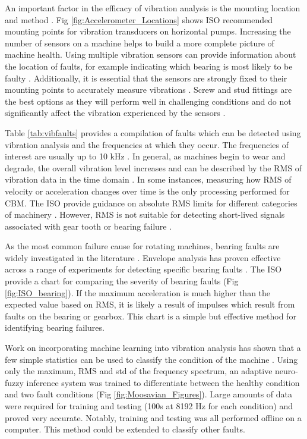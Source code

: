 An important factor in the efficacy of vibration analysis is the mounting location and method \cite{Smart_Bearings_1}.
Fig \ref{fig:Accelerometer_Locations} shows ISO recommended mounting points for vibration transducers on horizontal pumps.
Increasing the number of sensors on a machine helps to build a more complete picture of machine health.
Using multiple vibration sensors can provide information about the location of faults, for example indicating which bearing is most likely to be faulty \cite{CM_mcsa_vib}.
Additionally, it is essential that the sensors are strongly fixed to their mounting points to accurately measure vibrations \cite{Smart_Bearings_1}.
Screw and stud fittings are the best options as they will perform well in challenging conditions and do not significantly affect the vibration experienced by the sensors \cite{Smart_Bearings_1}.
\par

Table \ref{tab:vibfaults} provides a compilation of faults which can be detected using vibration analysis and the frequencies at which they occur.
The frequencies of interest are usually up to 10 kHz \cite{CM_randall}.
In general, as machines begin to wear and degrade, the overall vibration level increases and can be described by the RMS of vibration data in the time domain \cite{ISO13373-1}.
In some instances, measuring how RMS of velocity or acceleration changes over time is the only processing performed for CBM.
The ISO provide guidance on absolute RMS limits for different categories of machinery \cite{ISO10816-7}.
However, RMS is not suitable for detecting short-lived signals associated with gear tooth or bearing failure \cite{VIB_rms}.
\par

As the most common failure cause for rotating machines, bearing faults are widely investigated in the literature \cite{CM_mcsa_vib}\cite{ISO13373-9}\cite{VIB_distributed_bearing}.
Envelope analysis has proven effective across a range of experiments for detecting specific bearing faults \cite{CM_randall}\cite{VIB_distributed_bearing}\cite{VIB_basic_bearing}.
The ISO provide a chart for comparing the severity of bearing faults (Fig \ref{fig:ISO_bearing}).
If the maximum acceleration is much higher than the expected value based on RMS, it is likely a result of impulses which result from faults on the bearing or gearbox.
This chart is a simple but effective method for identifying bearing failures.
\par
Work on incorporating machine learning into vibration analysis has shown that a few simple statistics can be used to classify the condition of the machine \cite{VIB_moosavian}.
Using only the maximum, RMS and std of the frequency spectrum, an adaptive neuro-fuzzy inference system was trained to differentiate between the healthy condition and two fault conditions (Fig \ref{fig:Moosavian_Figures}).
Large amounts of data were required for training and testing (100s at 8192 Hz for each condition) and proved very accurate.
Notably, training and testing was all performed offline on a computer.
This method could be extended to classify other faults.

